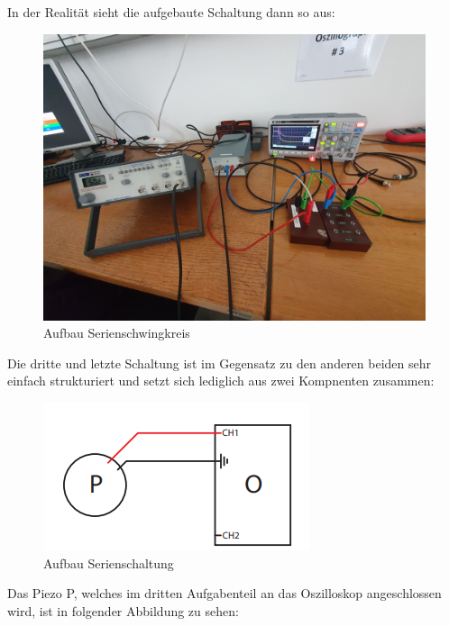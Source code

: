 \documentclass[12pt,a4paper,twoside]{article}
\begin{document}
\noindent
In der Realität sieht die aufgebaute Schaltung dann so aus:

\begin{figure}[H]
    \centering
    \includegraphics[width=0.6\linewidth, angle=0]{nudes/Aufbau Serienschaltung.jpg}
    \caption{Aufbau Serienschwingkreis}
    \label{fig:Aufbau Serienschwingkreis}
\end{figure} 

\noindent
Die dritte und letzte Schaltung ist im Gegensatz zu den anderen beiden sehr einfach strukturiert und setzt sich lediglich aus zwei Kompnenten zusammen:

\begin{figure}[H]
    \centering
    \includegraphics[width=0.6\linewidth, angle=0]{nudes/3.4 Eigenfrequenz.png}
    \caption{Aufbau Serienschaltung}
    \label{fig:Schaltplan Eigenfrequenzbestimmung}
\end{figure}

\noindent
Das Piezo P, welches im dritten Aufgabenteil an das Oszilloskop angeschlossen wird, ist in folgender Abbildung zu sehen:
\end{document}
